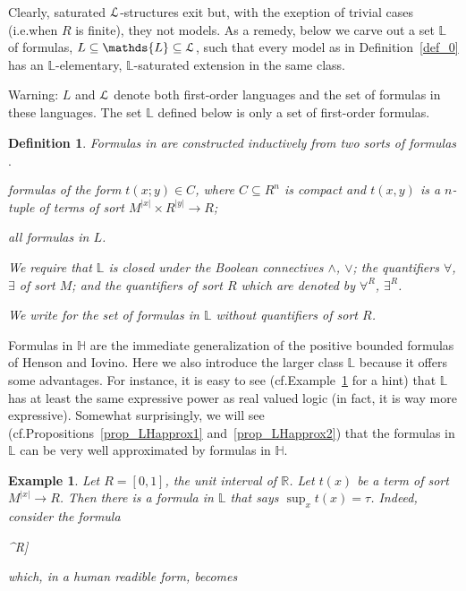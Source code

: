 \documentclass[11pt,oneside]{amsart}
\newcommand{\mylabel}[1]{{#1}\hfill}
\renewenvironment{itemize}
  {\begin{list}{$\cdot$}{%
   \setlength{\parskip}{0mm}
   \setlength{\topsep}{.2\baselineskip}
   \setlength{\rightmargin}{0mm}
   \setlength{\listparindent}{0mm}
   \setlength{\itemindent}{0mm}
   \setlength{\labelwidth}{3ex}
   \setlength{\itemsep}{.2\baselineskip}
   \setlength{\parsep}{.2\baselineskip}
   \setlength{\partopsep}{0mm}
   \setlength{\labelsep}{1ex}
   \setlength{\leftmargin}{\labelwidth+\labelsep}
   \let\makelabel\mylabel}}{%
   \end{list}}
\theoremstyle{plain}
\newtheorem{definition}[theorem]{Definition}
\newtheorem{example}[theorem]{Example}
\theoremstyle{remark}
\renewcommand*{\emph}[1]{%
   \smash{\tikz[baseline]\node[rectangle, fill=olive!25, rounded corners, inner xsep=0.5ex, inner ysep=0.2ex, anchor=base, minimum height = 2.7ex]{#1};}}
\begin{document}
Clearly, saturated ${\EuScript L}$-structures exit but, with the exeption of trivial cases (i.e.\@ when $R$ is finite), they not models.
As a remedy, below we carve out a set $\mathds{L}$ of formulas, $L\subseteq\mathds{L}\subseteq {\EuScript L}$, such that every model as in Definition~\ref{def_0} has an $\mathds{L}$-elementary, $\mathds{L}$-saturated extension in the same class.

Warning: $L$ and ${\EuScript L}$ denote both first-order languages and the set of formulas in these languages.
The set $\mathds{L}$ defined below is only a set of first-order formulas.

\begin{definition}\label{def_LL}
  Formulas in \emph{$\mathds{L}$\/} are constructed inductively from two sorts of \emph{$\mathds{L}$-atomic\/} formulas
  \begin{itemize}
  \item[i.] formulas of the form $t(x;y)\in C$, where $C\subseteq R^n$ is compact and $t(x,y)$ is a $n$-tuple of terms of sort $M^{|x|}\times R^{|y|}\to R$; 
  \item[ii.] all formulas in $L$.
  \end{itemize}
  We require that $\mathds{L}$ is closed under the Boolean connectives $\wedge$, $\vee$; the quantifiers $\forall$, $\exists$ of sort $M$; and the quantifiers of sort $R$ which are denoted by $\forall^R$, $\exists^R$.

  We write \emph{$\mathds{H}$ \/} for the set of formulas in $\mathds{L}$ without quantifiers of sort $R$.
\end{definition}

\noindent\llap{\textcolor{red}{\Large\dangersign}\kern1ex}\ignorespaces
Formulas in $\mathds{H}$ are the immediate generalization of the positive bounded formulas of Henson and Iovino.
Here we also introduce the larger class $\mathds{L}$ because it offers some advantages. 
For instance, it is easy to see (cf.\@ Example~\ref{ex_Rvlogic} for a hint) that $\mathds{L}$ has at least the same expressive power as real valued logic (in fact, it is way more expressive).
Somewhat surprisingly, we will see (cf.\@ Propositions~\ref{prop_LHapprox1} and~\ref{prop_LHapprox2}) that the formulas in $\mathds{L}$ can be very well approximated by formulas in $\mathds{H}$.

\begin{example}\label{ex_Rvlogic}
  Let $R=[0,1]$, the unit interval of $\mathds{R}$.
  Let $t(x)$ be a term of sort $M^{|x|}\to R$.
  Then there is a formula in $\mathds{L}$ that says $\sup_{x} t(x)=\tau$.
  Indeed, consider the formula

  {\wedge}{\forall^R\varepsilon \Big[\varepsilon\in\{0\}\ \vee\ \exists x\ \big[\big(\tau\dotminus t(x)\big)\dotminus\varepsilon\in\{0\}\big]\Big]}

  which, in a human readible form, becomes

  \hfill\qedsymbol
\end{example}
\end{document}
